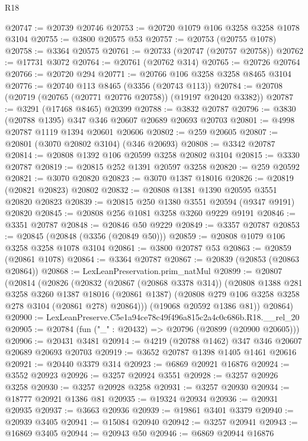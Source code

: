 \begin{lexlean}{R18}
\begin{coremodule}
@20747 := @20739 @20746
@20753 := @20720 @1079 @106 @3258 @3258 @1078 @3104
@20755 := @3800 @20575 @53
@20757 := @20753 (@20755 @1078)
@20758 := @3364 @20575
@20761 := @20733 (@20747 (@20757 @20758))
@20762 := @17731 @3072
@20764 := @20761 (@20762 @314)
@20765 := @20726 @20764
@20766 := @20720 @294
@20771 := @20766 @106 @3258 @3258 @8465 @3104
@20776 := @20740 @113 @8465 (@3356 (@20743 @113))
@20784 := @20708 (@20719 (@20765 (@20771 @20776 @20758)) (@19197 @20420 @3382))
@20787 := @3291 (@17468 @8465) @20399
@20788 := @3832 @20787
@20796 := @3830 (@20788 @1395) @347 @346 @20607 @20689 @20693 @20703
@20801 := @4998 @20787 @1119 @1394 @20601 @20606
@20802 := @259 @20605
@20807 := @20801 (@3070 @20802 @3104) (@346 @20693)
@20808 := @3342 @20787
@20814 := @20808 @1392 @106 @20599 @3258 @20802 @3104
@20815 := @3330 @20787
@20819 := @20815 @252 @1391 @20597 @3258
@20820 := @259 @20592
@20821 := @3070 @20820
@20823 := @3070 @1387 @18016
@20826 := @20819 (@20821 @20823) @20802
@20832 := @20808 @1381 @1390 @20595 @3551 @20820 @20823
@20839 := @20815 @250 @1380 @3551 @20594 (@9347 @9191) @20820
@20845 := @20808 @256 @1081 @3258 @3260 @9229 @9191
@20846 := @3351 @20787
@20848 := @20846 @50 @9229
@20849 := @3357 @20787
@20853 := @20845 (@20848 (@3356 (@20849 @50)))
@20859 := @20808 @1079 @106 @3258 @3258 @1078 @3104
@20861 := @3800 @20787 @53
@20863 := @20859 (@20861 @1078)
@20864 := @3364 @20787
@20867 := @20839 (@20853 (@20863 @20864))
@20868 := LexLeanPreservation.prim_natMul
@20899 := @20807
    (@20814
      (@20826
        (@20832
          (@20867 (@20868 @3378 @314))
          (@20808
            @1388
            @281
            @3258
            @3260
            @1387
            @18016
            (@20861 @1387)
            (@20808 @279 @106 @3258 @3258 @278 @3104 (@20861 @278) @20864)))
        (@19068 @20592 @1386 @81))
      @20864)
@20900 := LexLeanPreserve.C5e1a94ce78c49f496a815c2a4c0c686b.R18.__rel_20
@20905 := @20784 (fun ("_" : @20432) => @20796 (@20899 (@20900 @20605)))
@20906 := @20431 @3481
@20914 := @4219 (@20788 @1462) @347 @346 @20607 @20689 @20693 @20703
@20919 := @3652 @20787 @1398 @1405 @1461 @20616
@20921 := @20440 @3379 @314
@20923 := @6869 @20921 @16876
@20924 := @3552 @20923
@20926 := @3257 @20924 @3551
@20928 := @3257 @20926 @3258
@20930 := @3257 @20928 @3258
@20931 := @3257 @20930
@20934 := @18777 @20921 @1386 @81
@20935 := @19324 @20934
@20936 := @20931 @20935
@20937 := @3663 @20936
@20939 := @19861 @3401 @3379
@20940 := @20939 @3405
@20941 := @15084 @20940
@20942 := @3257 @20941
@20943 := @16869 @3405
@20944 := @20943 @50
@20946 := @6869 @20944 @16876

\end{coremodule}
\end{lexlean}
